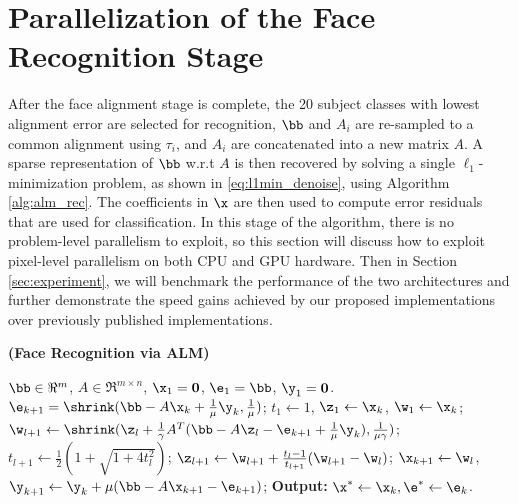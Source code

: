 \section{Parallelization of the Face Recognition Stage} 
\label{sec:recognition}
After the face alignment stage is complete, the 20 subject classes with lowest
alignment error are selected for recognition, $\bb$ and $A_i$ are re-sampled to a common alignment
using $\tau_i$, and $A_i$ are concatenated into a new matrix $A$.
A sparse representation of $\bb$ w.r.t $A$ is then recovered
by solving a single $\ell_1$-minimization problem, as shown
in \eqref{eq:l1min_denoise}, using Algorithm \ref{alg:alm_rec}.  The
coefficients in $\x$ are then used to compute error residuals that are used for
classification.  
In this stage of the algorithm, there is no problem-level
parallelism to exploit, so this section will discuss how to exploit pixel-level parallelism
on both CPU and GPU hardware.
Then in Section \ref{sec:experiment}, we will benchmark the
performance of the two architectures and further demonstrate the speed
gains achieved by our proposed implementations over previously published implementations.

\begin{algorithm}[t]
\caption{\bf (Face Recognition via ALM)} \label{alg:alm_rec} 
\begin{algorithmic}[1]
\begin{small}
 $\bb \in \Re^m$, $A \in \Re^{m \times n}$,
$\x_1 = \mathbf{0}$, $\e_1 = \bb$, $\y_1 =
\mathbf{0}$.
\STATE $\e_{k+1} = \shrink(\bb - A\x_k +
\frac{1}{\mu}\y_k, \frac{1}{\mu})$;
\STATE $t_1\leftarrow 1$, $\z_1 \leftarrow \x_k$, $\w_1 \leftarrow \x_k$;
\STATE $\w_{l+1} \leftarrow \shrink(\z_l +
\frac{1}{\gamma}A^T(\bb - A\z_l - \e_{k+1} +
\frac{1}{\mu}\y_k), \frac{1}{\mu\gamma})$;
\STATE $t_{l+1} \leftarrow \frac{1}{2}( 1 +
\sqrt{1+4t_l^2})$;
\STATE $\z_{l+1} \leftarrow \w_{l+1} + \frac{t_l - 1}{t_{l+1}}(\w_{l+1} - \w_l)$;
\ENDWHILE
\STATE $\x_{k+1} \leftarrow \w_{l}$,  \; $\y_{k+1} \leftarrow \y_k + \mu (\bb - A\x_{k+1} - \e_{k+1})$;
\ENDWHILE \STATE
{\bf Output:} $\x^* \leftarrow \x_k, \e^* \leftarrow \e_k$.
\end{small}
\end{algorithmic}
\end{algorithm}

